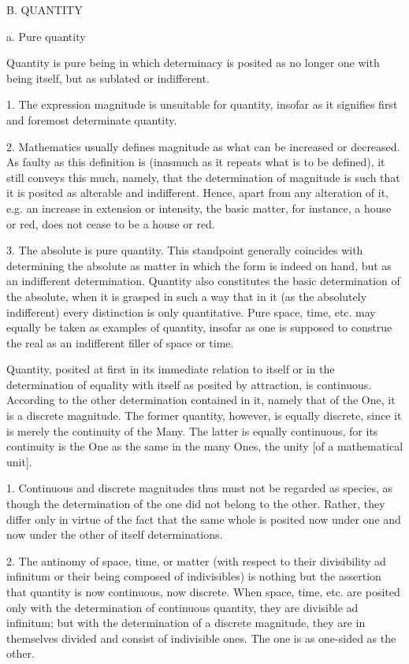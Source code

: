 B. QUANTITY

a. Pure quantity

Quantity is pure being in which determinacy is posited as
no longer one with being itself, but as sublated or indifferent.

1. The expression magnitude is unsuitable for quantity,
insofar as it signifies first and foremost determinate quantity.

2. Mathematics usually defines magnitude
as what can be increased or decreased.
As faulty as this definition is
(inasmuch as it repeats what is to be defined),
it still conveys this much, namely,
that the determination of magnitude is such that
it is posited as alterable and indifferent.
Hence, apart from any alteration of it,
e.g. an increase in extension or intensity,
the basic matter, for instance, a house or red,
does not cease to be a house or red.

3. The absolute is pure quantity.
This standpoint generally coincides
with determining the absolute as matter
in which the form is indeed on hand,
but as an indifferent determination.
Quantity also constitutes the basic
determination of the absolute,
when it is grasped in such a way
that in it (as the absolutely indifferent)
every distinction is only quantitative.
Pure space, time, etc. may equally
be taken as examples of quantity,
insofar as one is supposed to construe
the real as an indifferent filler of space or time.

Quantity, posited at first in
its immediate relation to itself
or in the determination of equality with itself
as posited by attraction, is continuous.
According to the other determination contained in it,
namely that of the One, it is a discrete magnitude.
The former quantity, however, is equally discrete,
since it is merely the continuity of the Many.
The latter is equally continuous,
for its continuity is the One
as the same in the many Ones,
the unity [of a mathematical unit].

1. Continuous and discrete magnitudes
thus must not be regarded as species,
as though the determination of the one
did not belong to the other.
Rather, they differ only in virtue of
the fact that the same whole is posited
now under one and now under the other
of itself determinations.

2. The antinomy of space, time, or matter
(with respect to their divisibility ad infinitum
or their being composed of indivisibles)
is nothing but the assertion that quantity is
now continuous, now discrete.
When space, time, etc. are posited only with
the determination of continuous quantity,
they are divisible ad infinitum;
but with the determination of a discrete magnitude,
they are in themselves divided
and consist of indivisible ones.
The one is as one-sided as the other.

